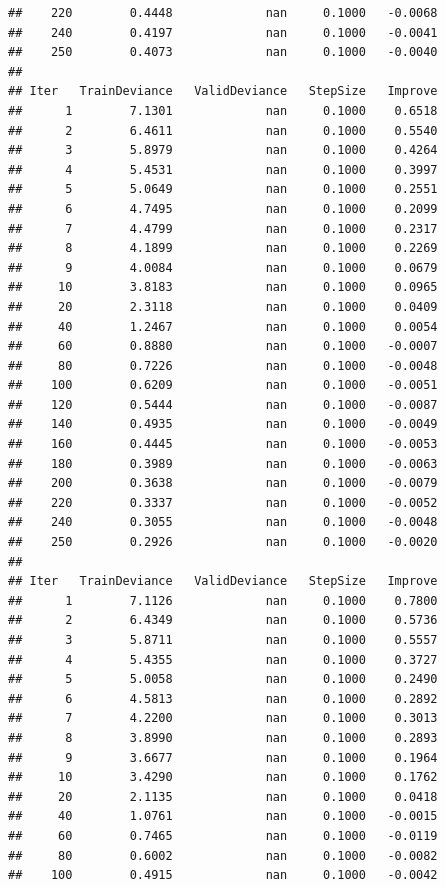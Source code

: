 \documentclass[
]{book}
\begin{document}
\begin{verbatim}
##    220        0.4448             nan     0.1000   -0.0068
##    240        0.4197             nan     0.1000   -0.0041
##    250        0.4073             nan     0.1000   -0.0040
## 
## Iter   TrainDeviance   ValidDeviance   StepSize   Improve
##      1        7.1301             nan     0.1000    0.6518
##      2        6.4611             nan     0.1000    0.5540
##      3        5.8979             nan     0.1000    0.4264
##      4        5.4531             nan     0.1000    0.3997
##      5        5.0649             nan     0.1000    0.2551
##      6        4.7495             nan     0.1000    0.2099
##      7        4.4799             nan     0.1000    0.2317
##      8        4.1899             nan     0.1000    0.2269
##      9        4.0084             nan     0.1000    0.0679
##     10        3.8183             nan     0.1000    0.0965
##     20        2.3118             nan     0.1000    0.0409
##     40        1.2467             nan     0.1000    0.0054
##     60        0.8880             nan     0.1000   -0.0007
##     80        0.7226             nan     0.1000   -0.0048
##    100        0.6209             nan     0.1000   -0.0051
##    120        0.5444             nan     0.1000   -0.0087
##    140        0.4935             nan     0.1000   -0.0049
##    160        0.4445             nan     0.1000   -0.0053
##    180        0.3989             nan     0.1000   -0.0063
##    200        0.3638             nan     0.1000   -0.0079
##    220        0.3337             nan     0.1000   -0.0052
##    240        0.3055             nan     0.1000   -0.0048
##    250        0.2926             nan     0.1000   -0.0020
## 
## Iter   TrainDeviance   ValidDeviance   StepSize   Improve
##      1        7.1126             nan     0.1000    0.7800
##      2        6.4349             nan     0.1000    0.5736
##      3        5.8711             nan     0.1000    0.5557
##      4        5.4355             nan     0.1000    0.3727
##      5        5.0058             nan     0.1000    0.2490
##      6        4.5813             nan     0.1000    0.2892
##      7        4.2200             nan     0.1000    0.3013
##      8        3.8990             nan     0.1000    0.2893
##      9        3.6677             nan     0.1000    0.1964
##     10        3.4290             nan     0.1000    0.1762
##     20        2.1135             nan     0.1000    0.0418
##     40        1.0761             nan     0.1000   -0.0015
##     60        0.7465             nan     0.1000   -0.0119
##     80        0.6002             nan     0.1000   -0.0082
##    100        0.4915             nan     0.1000   -0.0042

\end{verbatim}
\end{document}
